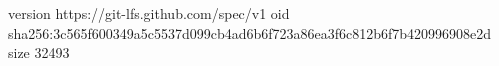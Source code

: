 version https://git-lfs.github.com/spec/v1
oid sha256:3c565f600349a5c5537d099cb4ad6b6f723a86ea3f6c812b6f7b420996908e2d
size 32493
